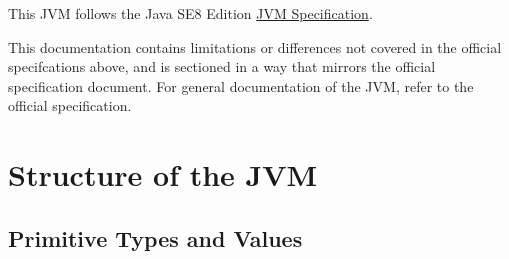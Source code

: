 

\newcommand{\Rule}[2]{\genfrac{}{}{0.7pt}{}{{\setlength{\fboxrule}{0pt}\setlength{\fboxsep}{3mm}\fbox{$#1$}}}{{\setlength{\fboxrule}{0pt}\setlength{\fboxsep}{3mm}\fbox{$#2$}}}}

\newcommand{\TruE}{\textbf{\texttt{true}}}
\newcommand{\FalsE}{\textbf{\texttt{false}}}
\newcommand{\AndOp}{\texttt{\&\&}}
\newcommand{\OrOp}{\texttt{||}}
\newcommand{\ThenOp}{\texttt{?}}
\newcommand{\ElseOp}{\texttt{:}}
\newcommand{\Rc}{\texttt{\}}}
\newcommand{\Lc}{\texttt{\{}}
\newcommand{\Rp}{\texttt{)}}
\newcommand{\Lp}{\texttt{(}}
\newcommand{\Fun}{\textbf{\texttt{function}}}
\newcommand{\Let}{\textbf{\texttt{let}}}
\newcommand{\Return}{\textbf{\texttt{return}}}
\newcommand{\Const}{\textbf{\texttt{const}}}
\newcommand{\If}{\textbf{\texttt{if}}}
\newcommand{\Else}{\textbf{\texttt{else}}}
\newcommand{\Bool}{\texttt{boolean}}
\newcommand{\Number}{\texttt{number}}
\newcommand{\String}{\texttt{string}}
\newcommand{\Undefined}{\texttt{undefined}}
\newcommand{\Null}{\texttt{null}}
\newcommand{\Any}{\texttt{any}}
\newcommand{\Void}{\texttt{void}}
\newcommand{\Pred}{\textit{Pred}}
\newcommand{\type}{\textit{type}}
\newcommand{\polytype}{\textit{polytype}}
\newcommand{\predtype}{\textit{predtype}}
\newcommand{\ExtractPos}{\ensuremath{\textit{Extract}^+}}
\newcommand{\ExtractNeg}{\ensuremath{\textit{Extract}^-}}





This JVM follows the Java SE8 Edition \href{https://docs.oracle.com/javase/specs/jvms/se8/html/index.html}{JVM Specification}.

This documentation contains limitations or differences not covered in the official specifcations above, and is sectioned
in a way that mirrors the official specification document. For general documentation of the JVM, refer to the official specification.

\section{Structure of the JVM}

\subsection{Primitive Types and Values}

